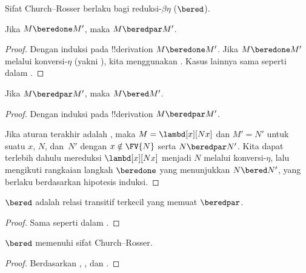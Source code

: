 \documentclass[../../../include/open-logic-section]{subfiles}
\begin{document}


Sifat Church--Rosser berlaku bagi reduksi-$\beta\eta$ ($\bered$).

\begin{lem}
  Jika $M \beredone M'$, maka $M \beredpar M'$.
\end{lem}

\begin{proof}
  Dengan induksi pada !!{derivation} $M \beredone M'$. Jika $M \beredone M'$
  melalui konversi-$\eta$ (yakni ), kita
  menggunakan . Kasus lainnya sama seperti dalam
  .
\end{proof}

\begin{lem}
  Jika $M \beredpar M'$, maka $M \bered M'$.
\end{lem}

\begin{proof} Dengan induksi pada !!{derivation} $M \beredpar M'$.

  Jika aturan terakhir adalah , maka
  $M=\lambd[x][Nx]$ dan $M'=N'$ untuk suatu $x$, $N$, dan~$N'$ dengan
  $x\notin\FV{N}$ serta $N\beredpar N'$. Kita dapat terlebih dahulu mereduksi
  $\lambd[x][Nx]$ menjadi $N$ melalui konversi-$\eta$, lalu mengikuti
  rangkaian langkah $\beredone$ yang menunjukkan $N\bered N'$, yang berlaku
  berdasarkan hipotesis induksi.
\end{proof}

\begin{lem}
  $\bered$ adalah relasi transitif terkecil yang memuat $\beredpar$.
\end{lem}

\begin{proof}
  Sama seperti dalam .
\end{proof}

\begin{thm}
  $\bered$ memenuhi sifat Church--Rosser.
\end{thm}

\begin{proof}
  Berdasarkan , , dan
  .
\end{proof}
\end{document}
